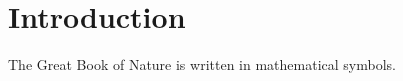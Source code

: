 \section{Introduction}
\begin{remark}
  The Great Book of Nature is written in mathematical symbols.
\end{remark}